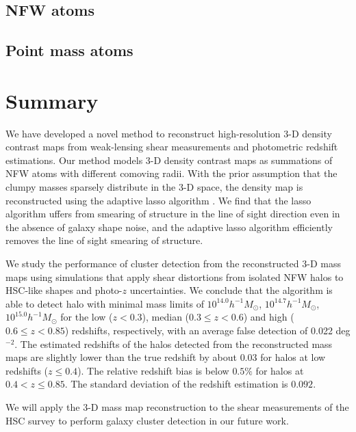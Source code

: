 \documentclass[twocolumn]{aastex63}
\begin{document}
\subsection{NFW atoms}
\label{subsec_test-nfw}


\subsection{Point mass atoms}
\label{subsec_test-pm}




\section{Summary}
\label{sec_Sum}

We have developed a novel method to reconstruct high-resolution $3$-D density
contrast maps from weak-lensing shear measurements and photometric redshift
estimations.  Our method models $3$-D density contrast maps as summations of
NFW atoms with different comoving radii.  With the prior assumption that the
clumpy masses sparsely distribute in the $3$-D space, the density map is
reconstructed using the adaptive lasso algorithm \citep{AdaLASSO-Zou2006}.
We find that the lasso algorithm uffers from smearing of structure
in the line of sight direction even in the absence of galaxy shape noise, and
the adaptive lasso algorithm efficiently removes the line of sight smearing of
structure.

We study the performance of cluster detection from the reconstructed $3$-D mass
maps using simulations that apply shear distortions from isolated NFW halos to
HSC-like shapes and photo-$z$ uncertainties.  We conclude that the algorithm is
able to detect halo with minimal mass limits of $10^{14.0} h^{-1}M_{\odot}$,
$10^{14.7} h^{-1}M_{\odot}$, $10^{15.0} h^{-1}M_{\odot}$ for the low ($z<0.3$),
median ($0.3\leq z< 0.6$) and high ($0.6\leq z< 0.85$) redshifts, respectively,
with an average false detection of 0.022 deg$^{-2}$. The estimated redshifts of
the halos detected from the reconstructed mass maps are slightly lower than the
true redshift by about $0.03$ for halos at low redshifts ($z\leq 0.4$).  The
relative redshift bias is below $0.5\%$ for halos at $0.4<z\leq 0.85$. The
standard deviation of the redshift estimation is $0.092$.

We will apply the $3$-D mass map reconstruction to the shear measurements of
the HSC survey \citep[e.g.,][]{HSC1-catalog,FPFSHSC1-Li2020} to perform galaxy
cluster detection in our future work.
\end{document}
